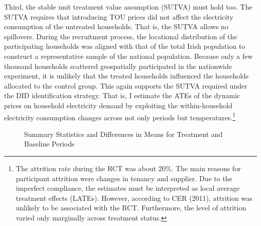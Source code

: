 {Third, the stable unit treatment value assumption (SUTVA) must hold too. The SUTVA requires that introducing TOU prices did not affect the electricity consumption of the untreated households. That is, the SUTVA allows no spillovers. During the recruitment process, the locational distribution of the participating households was aligned with that of the total Irish population to construct a representative sample of the national population. Because only a few thousand households scattered geospatially participated in the nationwide experiment, it is unlikely that the treated households influenced the households allocated to the control group. This again supports the SUTVA required under the DID identification strategy.} That is, I estimate the ATEs of the dynamic prices on household electricity demand by exploiting the within-household electricity consumption changes across not only periods but temperatures.\footnote{The attrition rate during the RCT was about 20\%. The main reasons for participant attrition were changes in tenancy and supplier. Due to the imperfect compliance, the estimates must be interpreted as local average treatment effects (LATEs). However, according to CER (2011), attrition was unlikely to be associated with the RCT. Furthermore, the level of attrition varied only marginally across treatment status.}

\begin{figure}
\caption{Summary Statistics and Differences in Means for Treatment and Baseline Periods}
\label{Figure:Summary-Statistics-and-Differences-in-Means-for-Treatment-and-Baseline-Periods}
\end{figure}
